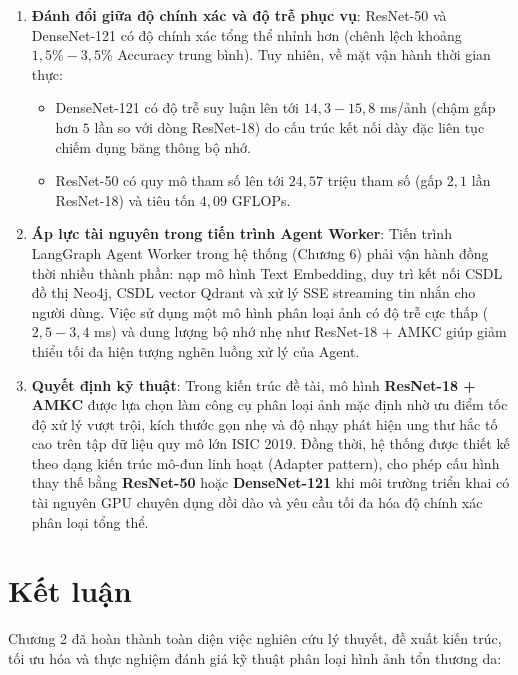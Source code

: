 \begin{enumerate}
  \item \textbf{Đánh đổi giữa độ chính xác và độ trễ phục vụ}:
  ResNet-50 và DenseNet-121 có độ chính xác tổng thể nhỉnh hơn (chênh lệch khoảng $1{,}5\% - 3{,}5\%$ Accuracy trung bình). Tuy nhiên, về mặt vận hành thời gian thực:
  \begin{itemize}
    \item DenseNet-121 có độ trễ suy luận lên tới $14{,}3 - 15{,}8$ ms/ảnh (chậm gấp hơn $5$ lần so với dòng ResNet-18) do cấu trúc kết nối dày đặc liên tục chiếm dụng băng thông bộ nhớ.
    \item ResNet-50 có quy mô tham số lên tới $24{,}57$ triệu tham số (gấp $2{,}1$ lần ResNet-18) và tiêu tốn $4{,}09$ GFLOPs.
  \end{itemize}

  \item \textbf{Áp lực tài nguyên trong tiến trình Agent Worker}:
  Tiến trình LangGraph Agent Worker trong hệ thống (Chương 6) phải vận hành đồng thời nhiều thành phần: nạp mô hình Text Embedding, duy trì kết nối CSDL đồ thị Neo4j, CSDL vector Qdrant và xử lý SSE streaming tin nhắn cho người dùng. Việc sử dụng một mô hình phân loại ảnh có độ trễ cực thấp ($2{,}5 - 3{,}4$ ms) và dung lượng bộ nhớ nhẹ như ResNet-18 + AMKC giúp giảm thiểu tối đa hiện tượng nghẽn luồng xử lý của Agent.

  \item \textbf{Quyết định kỹ thuật}:
  Trong kiến trúc đề tài, mô hình \textbf{ResNet-18 + AMKC} được lựa chọn làm công cụ phân loại ảnh mặc định nhờ ưu điểm tốc độ xử lý vượt trội, kích thước gọn nhẹ và độ nhạy phát hiện ung thư hắc tố cao trên tập dữ liệu quy mô lớn ISIC 2019. Đồng thời, hệ thống được thiết kế theo dạng kiến trúc mô-đun linh hoạt (Adapter pattern), cho phép cấu hình thay thế bằng \textbf{ResNet-50} hoặc \textbf{DenseNet-121} khi môi trường triển khai có tài nguyên GPU chuyên dụng dồi dào và yêu cầu tối đa hóa độ chính xác phân loại tổng thể.
\end{enumerate}

\section{Kết luận}

Chương 2 đã hoàn thành toàn diện việc nghiên cứu lý thuyết, đề xuất kiến trúc, tối ưu hóa và thực nghiệm đánh giá kỹ thuật phân loại hình ảnh tổn thương da:

